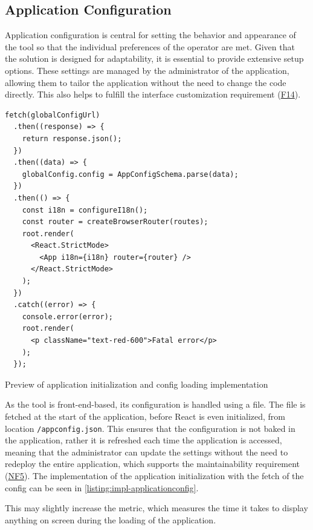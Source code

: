 \subsection{Application Configuration}

Application configuration is central for setting the behavior and appearance of the tool so that the individual preferences of the operator are met. Given that the solution is designed for adaptability, it is essential to provide extensive setup options. These settings are managed by the administrator of the application, allowing them to tailor the application without the need to change the code directly. This also helps to fulfill the interface customization requirement (\hyperref[itm:F14]{F14}).

\begin{listing}[h]
\begin{verbatim}
fetch(globalConfigUrl)
  .then((response) => {
    return response.json();
  })
  .then((data) => {
    globalConfig.config = AppConfigSchema.parse(data);
  })
  .then(() => {
    const i18n = configureI18n();
    const router = createBrowserRouter(routes);
    root.render(
      <React.StrictMode>
        <App i18n={i18n} router={router} />
      </React.StrictMode>
    );
  })
  .catch((error) => {
    console.error(error);
    root.render(
      <p className="text-red-600">Fatal error</p>
    );
  });
\end{verbatim}
\caption{Preview of application initialization and config loading implementation}
\label{listing:impl-applicationconfig}
\end{listing}

As the tool is front-end-based, its configuration is handled using a  file. The file is fetched at the start of the application, before React is even initialized, from location \texttt{/appconfig.json}. This ensures that the configuration is not baked in the application, rather it is refreshed each time the application is accessed, meaning that the administrator can update the settings without the need to redeploy the entire application, which supports the maintainability requirement (\hyperref[itm:NF5]{NF5}). The implementation of the application initialization with the fetch of the config can be seen in \autoref{listing:impl-applicationconfig}. 

This may slightly increase the  metric, which measures the time it takes to display anything on screen during the loading of the application.~\cite{Walton2023}

